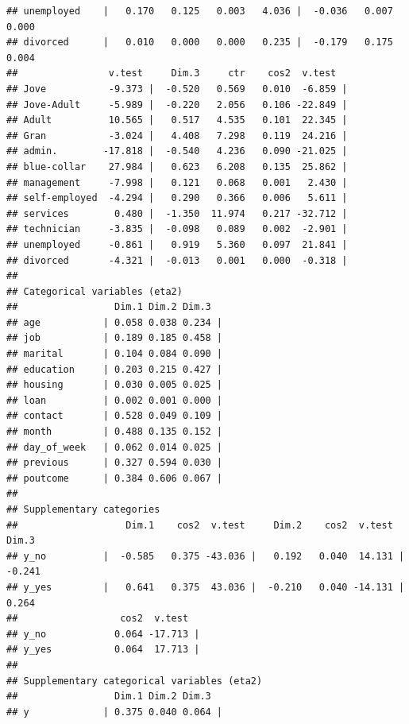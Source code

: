 \documentclass[
]{article}
\newenvironment{Shaded}{\begin{snugshade}}{\end{snugshade}}
\newcommand{\CommentTok}[1]{\textcolor[rgb]{0.56,0.35,0.01}{\textit{#1}}}
\newcommand{\DecValTok}[1]{\textcolor[rgb]{0.00,0.00,0.81}{#1}}
\newcommand{\FunctionTok}[1]{\textcolor[rgb]{0.00,0.00,0.00}{#1}}
\newcommand{\NormalTok}[1]{#1}
\newcommand{\OtherTok}[1]{\textcolor[rgb]{0.56,0.35,0.01}{#1}}
\newcommand{\SpecialCharTok}[1]{\textcolor[rgb]{0.00,0.00,0.00}{#1}}
\begin{document}
\begin{verbatim}
## unemployed    |   0.170   0.125   0.003   4.036 |  -0.036   0.007   0.000
## divorced      |   0.010   0.000   0.000   0.235 |  -0.179   0.175   0.004
##                v.test     Dim.3     ctr    cos2  v.test  
## Jove           -9.373 |  -0.520   0.569   0.010  -6.859 |
## Jove-Adult     -5.989 |  -0.220   2.056   0.106 -22.849 |
## Adult          10.565 |   0.517   4.535   0.101  22.345 |
## Gran           -3.024 |   4.408   7.298   0.119  24.216 |
## admin.        -17.818 |  -0.540   4.236   0.090 -21.025 |
## blue-collar    27.984 |   0.623   6.208   0.135  25.862 |
## management     -7.998 |   0.121   0.068   0.001   2.430 |
## self-employed  -4.294 |   0.290   0.366   0.006   5.611 |
## services        0.480 |  -1.350  11.974   0.217 -32.712 |
## technician     -3.835 |  -0.098   0.089   0.002  -2.901 |
## unemployed     -0.861 |   0.919   5.360   0.097  21.841 |
## divorced       -4.321 |  -0.013   0.001   0.000  -0.318 |
## 
## Categorical variables (eta2)
##                 Dim.1 Dim.2 Dim.3  
## age           | 0.058 0.038 0.234 |
## job           | 0.189 0.185 0.458 |
## marital       | 0.104 0.084 0.090 |
## education     | 0.203 0.215 0.427 |
## housing       | 0.030 0.005 0.025 |
## loan          | 0.002 0.001 0.000 |
## contact       | 0.528 0.049 0.109 |
## month         | 0.488 0.135 0.152 |
## day_of_week   | 0.062 0.014 0.025 |
## previous      | 0.327 0.594 0.030 |
## poutcome      | 0.384 0.606 0.067 |
## 
## Supplementary categories
##                   Dim.1    cos2  v.test     Dim.2    cos2  v.test     Dim.3
## y_no          |  -0.585   0.375 -43.036 |   0.192   0.040  14.131 |  -0.241
## y_yes         |   0.641   0.375  43.036 |  -0.210   0.040 -14.131 |   0.264
##                  cos2  v.test  
## y_no            0.064 -17.713 |
## y_yes           0.064  17.713 |
## 
## Supplementary categorical variables (eta2)
##                 Dim.1 Dim.2 Dim.3  
## y             | 0.375 0.040 0.064 |
\end{verbatim}

\begin{Shaded}
\end{Shaded}
\end{document}

